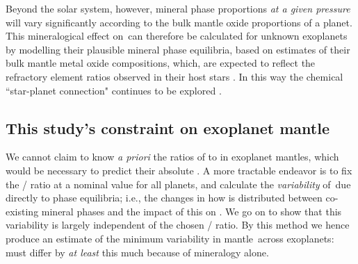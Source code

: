 Beyond the solar system, however, mineral phase proportions \textit{at a given pressure} will vary significantly according to the bulk mantle oxide proportions of a planet. This mineralogical effect on \fo\,can therefore be calculated for unknown exoplanets by modelling their plausible mineral phase equilibria, based on estimates of their bulk mantle metal oxide compositions, which, are expected to reflect the refractory element ratios observed in their host stars \citep{anders_solarsystem_1982, thiabaud_elemental_2015, bonsor_hoststar_2021}. In this way the chemical ``star-planet connection" \citep{hinkel_star_2018} continues to be explored \citep[e.g.,][]{unterborn_thorium_2015, dorn_can_2015, dorn_generalized_2017, dorn_bayesian_2017, santos_constraining_2017, dorn_new_2019, unterborn_effects_2017, unterborn_pressure_2019, putirka_composition_2019, wang_enhanced_2019, wang_detailed_2022, otegi_impact_2020, spaargaren_influence_2020, spaargaren_plausible_2022, unterborn_mantle_2022, unterborn_nominal_2023, guimond_mantle_2023}. 






 




\subsection{This study's constraint on exoplanet mantle \fo}

We cannot claim to know \textit{a priori} the ratios of  to  in exoplanet mantles, which would be necessary to predict their absolute \fo. A more tractable endeavor is to fix the / ratio at a nominal value for all planets, and calculate the \textit{variability} of \fo\,due directly to phase equilibria; i.e., the changes in how  is distributed between co-existing mineral phases and the impact of this on \fo. We go on to show that this variability is largely independent of the chosen / ratio. By this method we hence produce an estimate of the minimum variability in mantle \fo\,across exoplanets: \fo\,must differ by \textit{at least} this much because of mineralogy alone.

